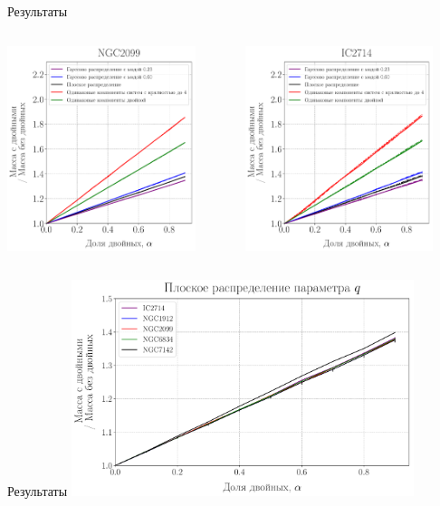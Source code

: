 \documentclass[pdf]{beamer}
\begin{document}
	
	\begin{frame}{Результаты}
		\begin{columns}
			\begin{column}{0.45\textwidth}
				\includegraphics[width=5.5cm]{images/alphas_NGC2099}
			\end{column}
			
			\begin{column}{0.5\textwidth} 
    			\includegraphics[width=5.5cm]{images/alphas_IC2714}
			\end{column}
		\end{columns}
	\end{frame}
	
	\begin{frame}{Результаты}
	\centering
		\includegraphics[width=10cm]{images/alphas_flat}
	\end{frame}
	
\end{document}
